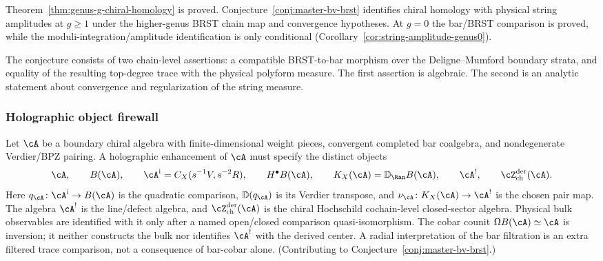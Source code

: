 \begin{remark}
Theorem~\ref{thm:genus-g-chiral-homology} is proved.
Conjecture~\ref{conj:master-bv-brst} identifies chiral homology
with physical string amplitudes at $g \geq 1$ under the higher-genus
BRST chain map and convergence hypotheses.
At $g = 0$ the bar/BRST comparison is proved, while the
moduli-integration/amplitude identification is only conditional
\textup{(}Corollary~\ref{cor:string-amplitude-genus0}\textup{)}.

The conjecture consists of two chain-level assertions: a compatible
BRST-to-bar morphism over the Deligne--Mumford boundary strata, and
equality of the resulting top-degree trace with the physical
polyform measure. The first assertion is algebraic. The second is an
analytic statement about convergence and regularization of the
string measure.
\end{remark}

\subsubsection{Holographic object firewall}

\begin{conjecture}
\label{conj:bulk-boundary-correspondence}
Let $\cA$ be a boundary chiral algebra with finite-dimensional weight
pieces, convergent completed bar coalgebra, and nondegenerate
Verdier/BPZ pairing. A holographic enhancement of $\cA$ must specify
the distinct objects
\[
\cA,\qquad
B(\cA),\qquad
\cA^{\mathrm i}=C_X(s^{-1}V,s^{-2}R),\qquad
H^\bullet B(\cA),\qquad
K_X(\cA)=\mathbb D_{\Ran}B(\cA),\qquad
\cA^!,\qquad
\cZ^{\mathrm{der}}_{\mathrm{ch}}(\cA).
\]
Here $q_\cA\colon\cA^{\mathrm i}\to B(\cA)$ is the quadratic
comparison, $\mathbb D(q_\cA)$ is its Verdier transpose, and
$\nu_\cA\colon K_X(\cA)\to\cA^!$ is the chosen pair map.  The algebra
$\cA^!$ is the line/defect algebra, and
$\cZ^{\mathrm{der}}_{\mathrm{ch}}(\cA)$ is the chiral Hochschild
cochain-level closed-sector algebra. Physical bulk observables are
identified with it only after a named open/closed comparison
quasi-isomorphism. The cobar counit $\Omega B(\cA)\simeq\cA$ is
inversion; it neither constructs the bulk nor identifies $\cA^!$ with
the derived center. A radial interpretation of the bar filtration is an
extra filtered trace comparison, not a consequence of bar-cobar alone.
(Contributing to Conjecture~\ref{conj:master-bv-brst}.)
\end{conjecture}



